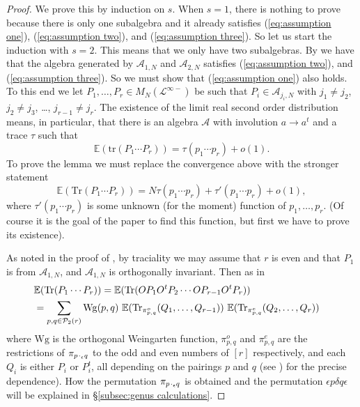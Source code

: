\documentclass[11pt]{amsart}
\theoremstyle{definition}
\numberwithin{theorem}{section}
\newcommand{\cA}{\mathcal{A}}
\newcommand{\cL}{\mathcal{L}}
\newcommand{\cP}{\mathcal{P}}
\newcommand{\sN}{{\scriptscriptstyle N}}
\newcommand{\peq}{{p \mskip 2mu\cdot_\epsilon q}}
\newcommand{\rE} {\mathbb{E}}
\newcommand{\Tr}{\mathrm{Tr}}
\newcommand{\tr}{\mathrm{tr}}
\newcommand{\Wg}{\mathrm{Wg}}
\begin{document}
\begin{proof}
We prove this by induction on $s$. When $s = 1$, there is
nothing to prove because there is only one subalgebra and it
already satisfies (\ref{eq:assumption one}),
(\ref{eq:assumption two}), and (\ref{eq:assumption
  three}). So let us start the induction with $s = 2$. This
means that we only have two subalgebras. By \cite[Prop. 29
  and Thm. 54]{mp} we have that the algebra generated by
$\cA_{1, \sN}$ and $\cA_{2, \sN}$ satisfies
(\ref{eq:assumption two}), and (\ref{eq:assumption
  three}). So we must show that (\ref{eq:assumption one})
also holds. To this end we let $P_1, \dots, P_r \in
M_N(\cL^{\infty-})$ be such that $P_i \in \cA_{j_i,\sN}$
with $j_1 \not= j_2$, $j_2 \not = j_3$, \dots, $j_{r-1} \not
= j_r$. The existence of the limit real second order
distribution means, in particular, that there is an algebra
$\cA$ with involution $a \to a^t$ and a trace $\tau$ such
that
\[
\rE(\tr(P_1 \cdots P_r)) = \tau(p_1 \cdots p_r) + o(1).
\]
To prove the lemma we must replace the convergence above with the stronger statement 
\[
\rE(\Tr(P_1 \cdots P_r)) = N \tau(p_1 \cdots p_r) + \tau'(p_1 \cdots p_r) +o(1),
\]
where $\tau'(p_1 \cdots p_r)$ is some unknown (for the
moment) function of $p_1, \dots, p_r$. (Of course it is the
goal of the paper to find this function, but first we have
to prove its existence).
 
 
 
As noted in the proof of \cite[Prop. 52]{mp}, by traciality
we may assume that $r$ is even and that $P_1$ is from
$\cA_{1, \sN}$, and $\cA_{1, \sN}$ is orthogonally
invariant. Then as in \cite[Eq. (33)]{mp}
\begin{align}\label{eq:joint genus expansion}\lefteqn{
\rE(\Tr(P_1 \cdots P_r)) = \rE(\Tr(OP_1 O^t P_2 \cdots  O P_{r-1} O^t P_r)) }\notag \\
& =
\sum_{p, q \in \cP_2(r)}
\Wg(p, q) \  \rE(\Tr_{\pi_{p,q}^o}(Q_1, \dots, Q_{r -1}))\ \rE(\Tr_{\pi_{p, q}^e}(Q_2, \dots, Q_{r})) 
\end{align}
where $\Wg$ is the orthogonal Weingarten function, $\pi_{p,
  q}^o$ and $\pi_{p, q}^e$ are the restrictions of
$\pi_\peq$ to the odd and even numbers of $[r]$
respectively, and each $Q_i$ is either $P_i$ or $P_i^t$, all
depending on the pairings $p$ and $q$ (see \cite[Lemmas 5 \&
  13]{mp}) for the precise dependence). How the permutation
$\pi_\peq$ is obtained and the permutation $\epsilon p
\delta q \epsilon$ will be explained in \S \ref{subsec:genus
  calculations}.

 





\end{proof}
\end{document}
